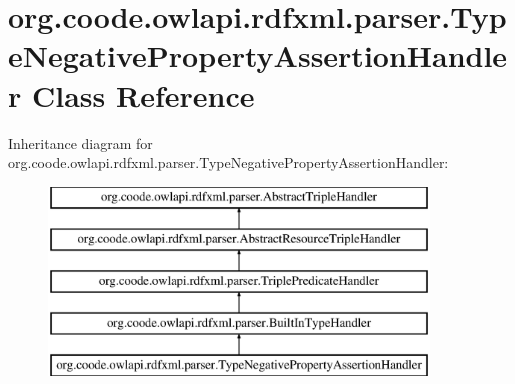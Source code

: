 \hypertarget{classorg_1_1coode_1_1owlapi_1_1rdfxml_1_1parser_1_1_type_negative_property_assertion_handler}{\section{org.\-coode.\-owlapi.\-rdfxml.\-parser.\-Type\-Negative\-Property\-Assertion\-Handler Class Reference}
\label{classorg_1_1coode_1_1owlapi_1_1rdfxml_1_1parser_1_1_type_negative_property_assertion_handler}
}
Inheritance diagram for org.\-coode.\-owlapi.\-rdfxml.\-parser.\-Type\-Negative\-Property\-Assertion\-Handler\-:\begin{figure}[H]
\begin{center}
\leavevmode
\includegraphics[height=5.000000cm]{classorg_1_1coode_1_1owlapi_1_1rdfxml_1_1parser_1_1_type_negative_property_assertion_handler}
\end{center}
\end{figure}
